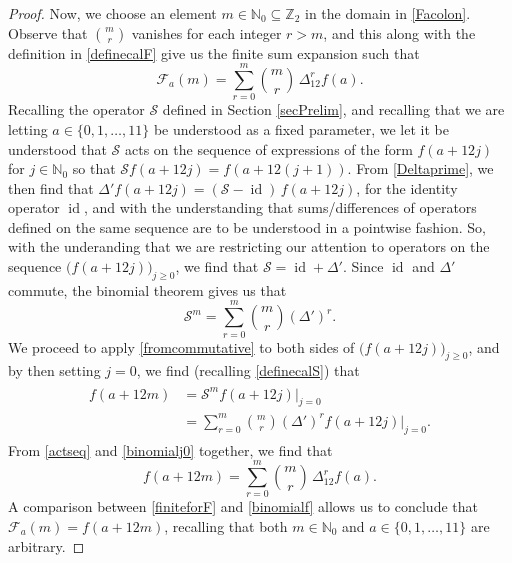 \documentclass[11pt,letterpaper]{amsart}
\begin{document}
\begin{proof}
 Now, we choose an element $m \in \mathbb{N}_{0} \subseteq \mathbb{Z}_{2}$ in the domain in \eqref{Facolon}. Observe that 
 $\binom{m}{r}$ vanishes for each integer $r > m$, 
 and this along with the definition in \eqref{definecalF} give us the finite sum expansion such that 
\begin{equation}\label{finiteforF}
 \mathcal{F}_{a}(m) = \sum_{r=0}^{m} \binom{m}{r} \, \Delta_{12}^{r} f(a). 
\end{equation}
 Recalling the operator $\mathcal{S}$ defined in Section \ref{secPrelim}, 
 and recalling that we are letting 
 $a \in \{ 0, 1, \ldots, 11 \}$ be understood as a fixed parameter, 
 we let it be understood that $\mathcal{S}$
 acts on the sequence of expressions of the form $f(a + 12 j)$
 for $j \in \mathbb{N}_{0}$ so that 
 $\mathcal{S} f(a + 12 j) = f(a + 12 (j+1))$. 
 From \eqref{Deltaprime}, we then find that 
 	 $ \Delta' f(a + 12j) = (\mathcal{S} - \operatorname{id}) \, f(a + 12 j)$, 
 for the identity operator $\operatorname{id}$, and with the understanding that sums/differences of operators
 defined on the same sequence are to be understood in a pointwise fashion. 
 So, with the underanding that we are restricting our attention to operators
 on the sequence $\big( f(a + 12 j) \big)_{j \geq 0}$, 
 we find that $\mathcal{S} = \operatorname{id} + \Delta'$. 
 Since $\operatorname{id}$ and $\Delta'$ commute, the binomial theorem gives us that 
\begin{equation}\label{fromcommutative} 
 \mathcal{S}^{m} = \sum_{r=0}^{m} \binom{m}{r} \left( \Delta' \right)^{r}. 
\end{equation}
 We proceed to apply \eqref{fromcommutative} to both 
 sides of $\big( f(a + 12 j) \big)_{j \geq 0}$, and by then setting $j=0$, we find 
 (recalling \eqref{definecalS}) that 
\begin{align}
\begin{split}
 f(a + 12 m) & = \mathcal{S}^{m} f(a + 12 j) \big|_{j=0} \\ 
 & = \sum_{r=0}^{m} \binom{m}{r} \left( \Delta' \right)^{r} 
 f(a + 12 j) \big|_{j=0}. 
\end{split}\label{binomialj0}
\end{align}
 From \eqref{actseq} and \eqref{binomialj0} together, we find that 
\begin{equation}\label{binomialf}
 f(a + 12m) = \sum_{r=0}^{m} \binom{m}{r} \, \Delta_{12}^{r} f(a). 
\end{equation}
 A comparison between \eqref{finiteforF} and \eqref{binomialf} 
 allows us to conclude that 
 $\mathcal{F}_{a}(m) = f(a + 12m)$, recalling that both $m \in \mathbb{N}_{0}$ and $a \in \{ 0, 1, \ldots, 11 \}$
 are arbitrary. 
\end{proof}
\end{document}
